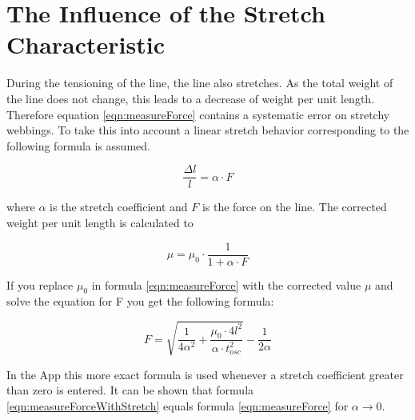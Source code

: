 \section{The Influence of the Stretch Characteristic}

During the tensioning of the line, the line also stretches. As the total weight of the line does not change, this leads to a decrease of weight per unit length. Therefore equation \ref{eqn:measureForce} contains a systematic error on stretchy webbings. To take this into account a linear stretch behavior corresponding to the following formula is assumed.

\begin{equation}
	\frac{\Delta l}{l} = \alpha \cdot F
\end{equation}

where $\alpha$ is the stretch coefficient and $F$ is the force on the line. The corrected weight per unit length is calculated to

\begin{equation}
	\mu = \mu_0 \cdot \frac{1}{1+\alpha\cdot F}
\end{equation}

If you replace $\mu_0$ in formula \ref{eqn:measureForce} with the corrected value $\mu$ and solve the equation for F you get the following formula:

\begin{equation}
	F = \sqrt{\frac{1}{4 \alpha^2} + \frac{\mu_0\cdot 4l^2}{\alpha \cdot t_{osc}^2}} - \frac{1}{2\alpha}
	\label{eqn:measureForceWithStretch}
\end{equation}

In the App this more exact formula is used whenever a stretch coefficient greater than zero is entered.
It can be shown that formula \ref{eqn:measureForceWithStretch} equals formula \ref{eqn:measureForce} for $\alpha\rightarrow 0$.